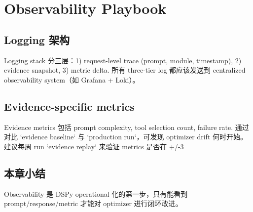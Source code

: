 \section{Observability Playbook}

\subsection{Logging 架构}

Logging stack 分三层：1) request-level trace (prompt, module, timestamp), 2) evidence snapshot, 3) metric delta. 所有 three-tier log 都应该发送到 centralized observability system（如 Grafana + Loki）。

\subsection{Evidence-specific metrics}

Evidence metrics 包括 prompt complexity, tool selection count, failure rate. 通过对比 `evidence baseline` 与 `production run`，可发现 optimizer drift 何时开始。建议每周 run `evidence replay` 来验证 metrics 是否在 +/-3%

\subsection{本章小结}

Observability 是 DSPy operational 化的第一步，只有能看到 prompt/response/metric 才能对 optimizer 进行闭环改进。

